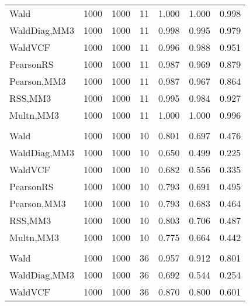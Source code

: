 \documentclass[
]{article}
\begin{document}
\begin{table}[H]
{\begin{tabular}[t]{lrrrrrr}
\hspace{1em}Wald & 1000 & 1000 & 11 & 1.000 & 1.000 & 0.998\\
\hspace{1em}WaldDiag,MM3 & 1000 & 1000 & 11 & 0.998 & 0.995 & 0.979\\
\hspace{1em}WaldVCF & 1000 & 1000 & 11 & 0.996 & 0.988 & 0.951\\
\hspace{1em}PearsonRS & 1000 & 1000 & 11 & 0.987 & 0.969 & 0.879\\
\hspace{1em}Pearson,MM3 & 1000 & 1000 & 11 & 0.987 & 0.967 & 0.864\\
\hspace{1em}RSS,MM3 & 1000 & 1000 & 11 & 0.995 & 0.984 & 0.927\\
\hspace{1em}Multn,MM3 & 1000 & 1000 & 11 & 1.000 & 1.000 & 0.996\\
\addlinespace[0.3em]
\multicolumn{7}{l}{\textbf{2F 10V}}\\
\hspace{1em}Wald & 1000 & 1000 & 10 & 0.801 & 0.697 & 0.476\\
\hspace{1em}WaldDiag,MM3 & 1000 & 1000 & 10 & 0.650 & 0.499 & 0.225\\
\hspace{1em}WaldVCF & 1000 & 1000 & 10 & 0.682 & 0.556 & 0.335\\
\hspace{1em}PearsonRS & 1000 & 1000 & 10 & 0.793 & 0.691 & 0.495\\
\hspace{1em}Pearson,MM3 & 1000 & 1000 & 10 & 0.793 & 0.683 & 0.464\\
\hspace{1em}RSS,MM3 & 1000 & 1000 & 10 & 0.803 & 0.706 & 0.487\\
\hspace{1em}Multn,MM3 & 1000 & 1000 & 10 & 0.775 & 0.664 & 0.442\\
\addlinespace[0.3em]
\multicolumn{7}{l}{\textbf{3F 15V}}\\
\hspace{1em}Wald & 1000 & 1000 & 36 & 0.957 & 0.912 & 0.801\\
\hspace{1em}WaldDiag,MM3 & 1000 & 1000 & 36 & 0.692 & 0.544 & 0.254\\
\hspace{1em}WaldVCF & 1000 & 1000 & 36 & 0.870 & 0.800 & 0.601\\

\end{tabular}}
\end{table}
\end{document}
